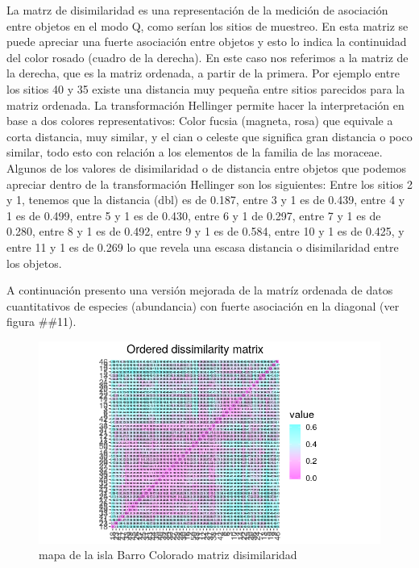 \documentclass[11pt,]{article}
\begin{document}
La matrz de disimilaridad es una representación de la medición de
asociación entre objetos en el modo Q, como serían los sitios de
muestreo. En esta matriz se puede apreciar una fuerte asociación entre
objetos y esto lo indica la continuidad del color rosado (cuadro de la
derecha). En este caso nos referimos a la matriz de la derecha, que es
la matriz ordenada, a partir de la primera. Por ejemplo entre los sitios
40 y 35 existe una distancia muy pequeña entre sitios parecidos para la
matriz ordenada. La transformación Hellinger permite hacer la
interpretación en base a dos colores representativos: Color fucsia
(magneta, rosa) que equivale a corta distancia, muy similar, y el cian o
celeste que significa gran distancia o poco similar, todo esto con
relación a los elementos de la familia de las moraceae. Algunos de los
valores de disimilaridad o de distancia entre objetos que podemos
apreciar dentro de la transformación Hellinger son los siguientes: Entre
los sitios 2 y 1, tenemos que la distancia (dbl) es de 0.187, entre 3 y
1 es de 0.439, entre 4 y 1 es de 0.499, entre 5 y 1 es de 0.430, entre 6
y 1 de 0.297, entre 7 y 1 es de 0.280, entre 8 y 1 es de 0.492, entre 9
y 1 es de 0.584, entre 10 y 1 es de 0.425, y entre 11 y 1 es de 0.269 lo
que revela una escasa distancia o disimilaridad entre los objetos.

A continuación presento una versión mejorada de la matríz ordenada de
datos cuantitativos de especies (abundancia) con fuerte asociación en la
diagonal (ver figura \#\#11).

\begin{figure}
\centering
\includegraphics[width=1.00000\textwidth]{matrizdedisimilaridad.png}
\caption{mapa de la isla Barro Colorado matriz disimilaridad
\label{fig:bci_map}}
\end{figure}
\end{document}
